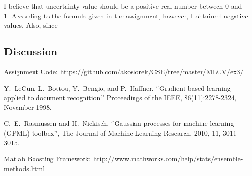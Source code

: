 \documentclass[journal, a4paper]{IEEEtran}
\begin{document}
    I believe that uncertainty value should be a positive real number between 0 and 1. According to the formula given in the assignment, however, I obtained negative values. Also, since 

    
  \subsection{Discussion}


% 
% 


\begin{thebibliography}{5}

    Assignment Code: \url{https://github.com/akosiorek/CSE/tree/master/MLCV/ex3/}

    Y.~LeCun, L.~Bottou, Y.~Bengio, and P.~Haffner. ``Gradient-based learning applied to document recognition.'' Proceedings of the IEEE, 86(11):2278-2324, November 1998.

    C.~E.~Rasmussen and H.~Nickisch, ``Gaussian processes for machine learning (GPML) toolbox'', The Journal of Machine Learning Research, 2010, 11, 3011-3015.
    
    Matlab Boosting Framework: \url{http://www.mathworks.com/help/stats/ensemble-methods.html}    
    

\end{thebibliography}

\end{document}
